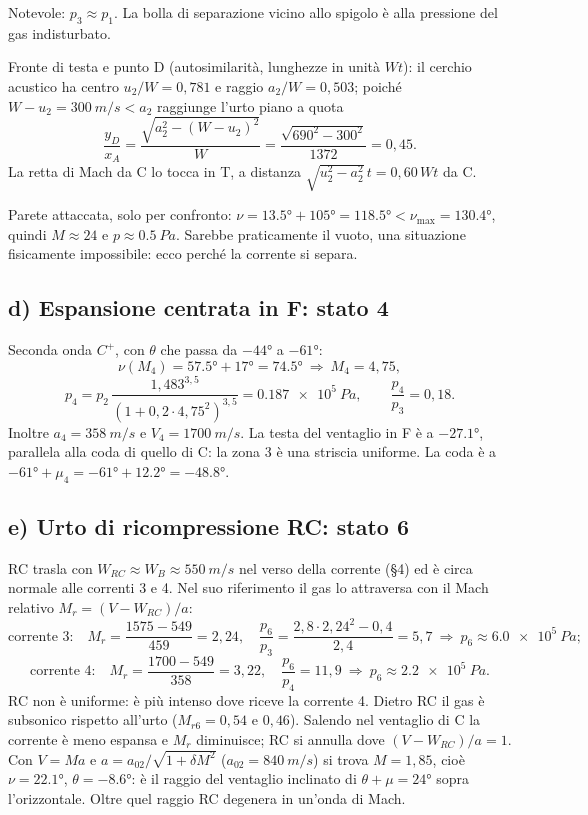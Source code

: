 \documentclass[11pt,a4paper]{article}
\newcommand{\Cp}{C^{+}}
\begin{document}
Notevole: $p_3\approx p_1$. La bolla di separazione vicino allo spigolo è alla pressione del gas indisturbato.

Fronte di testa e punto D (autosimilarità, lunghezze in unità $Wt$): il cerchio acustico ha centro
$u_2/W=0{,}781$ e raggio $a_2/W=0{,}503$; poiché $W-u_2=\SI{300}{m/s}<a_2$ raggiunge l'urto piano a quota
\[
\frac{y_D}{x_A}=\frac{\sqrt{a_2^2-(W-u_2)^2}}{W}=\frac{\sqrt{690^2-300^2}}{1372}=0{,}45 .
\]
La retta di Mach da C lo tocca in T, a distanza $\sqrt{u_2^2-a_2^2}\,t=0{,}60\,Wt$ da C.

Parete attaccata, solo per confronto: $\nu=\ang{13.5}+\ang{105}=\ang{118.5}<\nu_{\max}=\ang{130.4}$, quindi
$M\approx24$ e $p\approx\SI{0.5}{Pa}$. Sarebbe praticamente il vuoto, una situazione fisicamente impossibile: ecco
perché la corrente si separa.

\subsection*{d) Espansione centrata in F: stato 4}
Seconda onda $\Cp$, con $\theta$ che passa da $-\ang{44}$ a $-\ang{61}$:
\[
\nu(M_4)=\ang{57.5}+\ang{17}=\ang{74.5}\ \Rightarrow\ M_4=4{,}75,
\]
\[
p_4=p_2\,\frac{1{,}483^{3{,}5}}{(1+0{,}2\cdot4{,}75^2)^{3{,}5}}=\SI{0.187e5}{Pa},\qquad \frac{p_4}{p_3}=0{,}18 .
\]
Inoltre $a_4=\SI{358}{m/s}$ e $V_4=\SI{1700}{m/s}$. La testa del ventaglio in F è a $\ang{-27.1}$, parallela alla coda
di quello di C: la zona 3 è una striscia uniforme. La coda è a $-\ang{61}+\mu_4=-\ang{61}+\ang{12.2}=\ang{-48.8}$.

\subsection*{e) Urto di ricompressione RC: stato 6}
RC trasla con $W_{RC}\approx W_B\approx\SI{550}{m/s}$ nel verso della corrente (§4) ed è circa normale alle
correnti 3 e 4. Nel suo riferimento il gas lo attraversa con il Mach relativo $M_r=(V-W_{RC})/a$:
\[
\text{corrente 3:}\quad M_r=\frac{1575-549}{459}=2{,}24,\quad \frac{p_6}{p_3}=\frac{2{,}8\cdot2{,}24^2-0{,}4}{2{,}4}=5{,}7
\ \Rightarrow\ p_6\approx\SI{6.0e5}{Pa};
\]
\[
\text{corrente 4:}\quad M_r=\frac{1700-549}{358}=3{,}22,\quad \frac{p_6}{p_4}=11{,}9
\ \Rightarrow\ p_6\approx\SI{2.2e5}{Pa}.
\]
RC non è uniforme: è più intenso dove riceve la corrente 4. Dietro RC il gas è subsonico rispetto all'urto
($M_{r6}=0{,}54$ e $0{,}46$). Salendo nel ventaglio di C la corrente è meno espansa e $M_r$ diminuisce; RC si annulla
dove $(V-W_{RC})/a=1$. Con $V=Ma$ e $a=a_{02}/\sqrt{1+\delta M^2}$ ($a_{02}=\SI{840}{m/s}$) si trova $M=1{,}85$, cioè
$\nu=\ang{22.1}$, $\theta=\ang{-8.6}$: è il raggio del ventaglio inclinato di $\theta+\mu=\ang{24}$ sopra l'orizzontale.
Oltre quel raggio RC degenera in un'onda di Mach.
\end{document}
